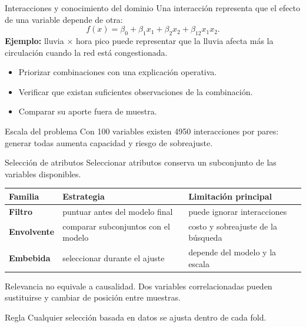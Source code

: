 \documentclass[aspectratio=169,10pt]{beamer}
\begin{document}
\begin{frame}{Interacciones y conocimiento del dominio}
  \footnotesize
  Una interacción representa que el efecto de una variable depende de otra:
  \[
    f(x)=\beta_0+\beta_1x_1+\beta_2x_2+\beta_{12}x_1x_2.
  \]
  \textbf{Ejemplo:} lluvia $\times$ hora pico puede representar que la lluvia afecta más la circulación cuando la red está congestionada.
  \begin{itemize}
    \item Priorizar combinaciones con una explicación operativa.
    \item Verificar que existan suficientes observaciones de la combinación.
    \item Comparar su aporte fuera de muestra.
  \end{itemize}
  \begin{alertblock}{Escala del problema}
    Con 100 variables existen 4950 interacciones por pares: generar todas aumenta capacidad y riesgo de sobreajuste.
  \end{alertblock}
\end{frame}

\begin{frame}{Selección de atributos}
  \footnotesize
  Seleccionar atributos conserva un subconjunto de las variables disponibles.
  \begin{tabularx}{\textwidth}{>{\bfseries}p{} p{} X}
    \toprule Familia & Estrategia & Limitación principal \\ \midrule
    Filtro & puntuar antes del modelo final & puede ignorar interacciones \\
    Envolvente & comparar subconjuntos con el modelo & costo y sobreajuste de la búsqueda \\
    Embebida & seleccionar durante el ajuste & depende del modelo y la escala \\
    \bottomrule
  \end{tabularx}
  \vspace{.4em}
  Relevancia no equivale a causalidad. Dos variables correlacionadas pueden sustituirse y cambiar de posición entre muestras.
  \begin{block}{Regla}
    Cualquier selección basada en datos se ajusta dentro de cada fold.
  \end{block}
\end{frame}
\end{document}

